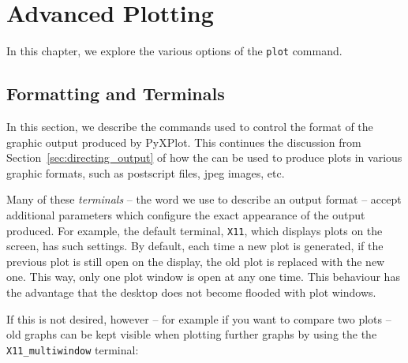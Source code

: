 %
%
%
%
%



\chapter{Advanced Plotting}
\label{ch:plotting}

In this chapter, we explore the various options of the {\tt plot} command.

\section{Formatting and Terminals}
\label{sec:set_terminal}

In this section, we describe the commands used to control the format of the
graphic output produced by PyXPlot. This continues the discussion from
Section~\ref{sec:directing_output} of how the  can be
used to produce plots in various graphic formats, such as postscript files,
jpeg images, etc.

Many of these {\it terminals} -- the word we use to describe an output format
-- accept additional parameters which configure the exact appearance of the
output produced.  For example, the default terminal, {\tt X11}, which displays
plots on the screen, has such settings. By default, each time a new plot is
generated, if the previous plot is still open on the display, the old plot is
replaced with the new one. This way, only one plot window is open at any one
time.  This behaviour has the advantage that the desktop does not become
flooded with plot windows.

If this is not desired, however -- for example if you want to compare two plots
-- old graphs can be kept visible when plotting further graphs by using the the
{\tt X11\_multiwindow} terminal:

